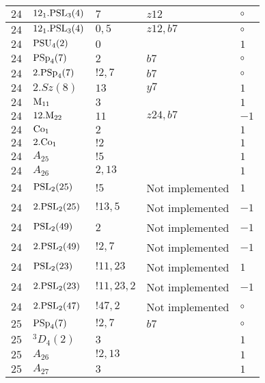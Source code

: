 \documentclass[a4paper, 11pt]{article}
\begin{document}
\begin{longtable}{lllll}
        $ 24 $ & $ 12_1.{\rm PSL}_{3}(4) $ & $ 7 $ & $ z12 $ &  $\circ$ \\ \hline
        $ 24 $ & $ 12_1.{\rm PSL}_{3}(4) $ & $ 0,5 $ & $ z12, b7 $ &  $\circ$ \\ \hline
        $ 24 $ & $ {\rm PSU}_{4}(2) $ & $ 0 $ & $ ~ $ & $ 1$ \\ \hline
        $ 24 $ & $ {\rm PSp}_{4}(7) $ & $ 2 $ & $ b7 $ &  $\circ$ \\ \hline
        $ 24 $ & $ 2.{\rm PSp}_{4}(7) $ & $ ! 2,7 $ & $ b7 $ &  $\circ$ \\ \hline
        $ 24 $ & $ 2.Sz(8) $ & $ 13 $ & $ y7 $ & $ 1$ \\ \hline
        $ 24 $ & $ {\rm M}_{11} $ & $ 3 $ & $ ~ $ & $ 1$ \\ \hline
        $ 24 $ & $ 12.{\rm M}_{22} $ & $ 11 $ & $ z24, b7 $ & $ -1$ \\ \hline
        $ 24 $ & $ {\rm Co}_1 $ & $ 2 $ & $ ~ $ & $ 1$ \\ \hline
        $ 24 $ & $ 2.{\rm Co}_1 $ & $ ! 2 $ & $ ~ $ & $ 1$ \\ \hline
        $ 24 $ & $ A_{25} $ & $ !5 $ & $ ~ $ & $ 1$ \\ \hline
        $ 24 $ & $ A_{26} $ & $ 2, 13 $ & $ ~ $ & $ 1$ \\ \hline
        $ 24 $ & $ {\rm PSL}_{2}(25) $ & $ !5 $ &  Not implemented & $ 1$ \\ \hline
        $ 24 $ & $ 2.{\rm PSL}_{2}(25) $ & $ !13, 5 $ &  Not implemented & $ -1$ \\ \hline
        $ 24 $ & $ {\rm PSL}_{2}(49) $ & $ 2 $ &  Not implemented & $ -1$ \\ \hline
        $ 24 $ & $ 2.{\rm PSL}_{2}(49) $ & $ !2, 7 $ &  Not implemented & $ -1$ \\ \hline
        $ 24 $ & $ {\rm PSL}_{2}(23) $ & $ !11, 23 $ &  Not implemented & $ 1$ \\ \hline
        $ 24 $ & $ 2.{\rm PSL}_{2}(23) $ & $ !11, 23, 2 $ &  Not implemented & $ -1$ \\ \hline
        $ 24 $ & $ 2.{\rm PSL}_{2}(47) $ & $ !47, 2 $ &  Not implemented &  $\circ$ \\ \hline
        $ 25 $ & $ {\rm PSp}_{4}(7) $ & $ ! 2,7 $ & $ b7 $ &  $\circ$ \\ \hline
        $ 25 $ & $ {}^3D_4(2) $ & $ 3 $ & $ ~ $ & $ 1$ \\ \hline
        $ 25 $ & $ A_{26} $ & $ !2, 13 $ & $ ~ $ & $ 1$ \\ \hline
        $ 25 $ & $ A_{27} $ & $ 3 $ & $ ~ $ & $ 1$ \\ \hline

\end{longtable}
\end{document}
